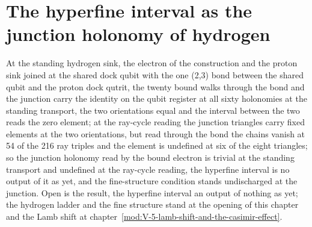\section{The hyperfine interval as the junction holonomy of hydrogen}\label{mod:V-4-D538525-w-hyjh}
\begin{chwall}\label{box:V-4-D538525-w-hyjh:1}
At the standing hydrogen sink, the electron of the construction and the proton sink joined at the shared dock qubit with the one (2,3) bond between the shared qubit and the proton dock qutrit, the twenty bound walks through the bond and the junction carry the identity on the qubit register at all sixty holonomies at the standing transport, the two orientations equal and the interval between the two reads the zero element; at the ray-cycle reading the junction triangles carry fixed elements at the two orientations, but read through the bond the chains vanish at 54 of the 216 ray triples and the element is undefined at six of the eight triangles; so the junction holonomy read by the bound electron is trivial at the standing transport and undefined at the ray-cycle reading, the hyperfine interval is no output of it as yet, and the fine-structure condition stands undischarged at the junction.
Open is the result, the hyperfine interval an output of nothing as yet; the hydrogen ladder and the fine structure stand at the opening of this chapter and the Lamb shift at chapter~\ref{mod:V-5-lamb-shift-and-the-casimir-effect}.
\end{chwall}
